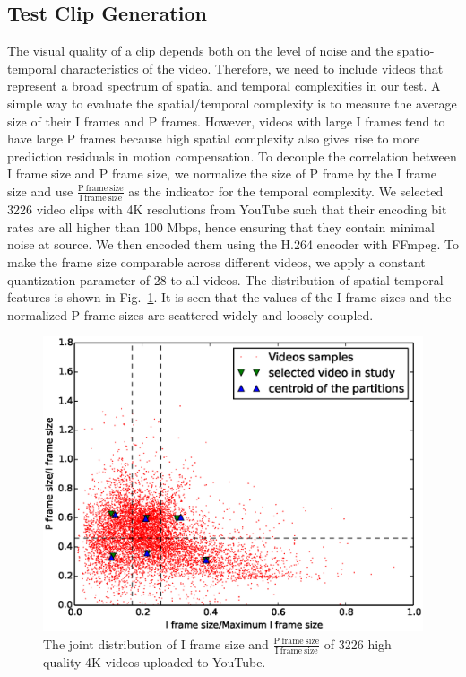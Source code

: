 \documentclass{sig-alternate}
\begin{document}
\subsection{Test Clip Generation}
The visual quality of a clip depends both on the level of noise and the spatio-temporal characteristics of the video. Therefore, we need to include videos that represent a broad spectrum of spatial and temporal complexities in our test. A simple way to evaluate the spatial/temporal complexity is to measure the average size of their I frames and P frames. However, videos with large I frames tend to have large P frames because high spatial complexity also gives rise to more prediction residuals in motion compensation. To decouple the correlation between I frame size and P frame size, we normalize the size of P frame by the I frame size and use $\frac{\mathrm{P\ frame\ size}}{\mathrm{I\ frame\ size}}$ as the indicator for the temporal complexity. We selected 3226 video clips with 4K resolutions from YouTube such that their encoding bit rates are all higher than 100 Mbps, hence ensuring that they contain minimal noise at source. We then encoded them using the H.264 encoder with FFmpeg. To make the frame size comparable across different videos, we apply a constant quantization parameter of 28 to all videos. The distribution of spatial-temporal features is shown in Fig.~\ref{fig:distribution}. It is seen that the values of the I frame sizes and the normalized P frame sizes are scattered widely and loosely coupled.
\begin{figure}[!hb]
	\centering
	\includegraphics[width=\columnwidth]{img/distribution.eps}
	\caption{\label{fig:distribution} The joint distribution of I frame size and $\frac{\mathrm{P\ frame\ size}}{\mathrm{I\ frame\ size}}$ of 3226 high quality 4K videos uploaded to YouTube.}
\end{figure}
\end{document}
